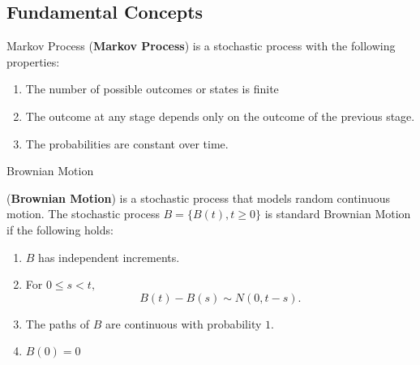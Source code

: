 \subsection{Fundamental Concepts}
%
\begin{frame}{Markov Process}
(\textbf{Markov Process}) is a stochastic process with the following properties: 
\begin{enumerate}
\item The number of possible outcomes or states is finite
\item The outcome at any stage depends only on the outcome of the previous stage.
\item The probabilities are constant over time.   
\end{enumerate}
\end{frame}


\begin{frame}{Brownian Motion}
\begin{definition}(\textbf{Brownian Motion}) is a stochastic process that models random continuous motion. The stochastic process $B=\{B(t), t\geq 0\}$ is standard Brownian Motion if the following holds:
\begin{enumerate}
\item $B$ has independent increments.
\item For $0 \leq s < t,$ $$B(t)-B(s) \sim N(0,t-s).$$
\item The paths of $B$ are continuous with probability $1$.
\item $B(0)=0$ 
\end{enumerate}
\end{definition}
\end{frame}

\begin{frame}
\vfill

\begin{center}
\end{center}

\vfill
  \cite{doi:10.1137/S0036144500378302}
\end{frame}

